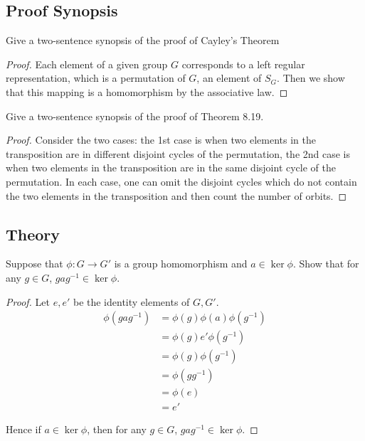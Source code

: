 \subsection*{Proof Synopsis}

\begin{exercise}
    Give a two-sentence synopsis of the proof of Cayley's Theorem
\end{exercise}

\begin{proof}
    Each element of a given group $G$ corresponds to a left regular representation, which is a permutation of $G$, an element of $S_{G}$. Then we show that this mapping is a homomorphism by the associative law.
\end{proof}

\begin{exercise}
    Give a two-sentence synopsis of the proof of Theorem 8.19.
\end{exercise}

\begin{proof}
    Consider the two cases: the 1st case is when two elements in the transposition are in different disjoint cycles of the permutation, the 2nd case is when two elements in the transposition are in the same disjoint cycle of the permutation. In each case, one can omit the disjoint cycles which do not contain the two elements in the transposition and then count the number of orbits.
\end{proof}

\subsection*{Theory}

\begin{exercise}
    Suppose that $\phi: G\to G'$ is a group homomorphism and $a\in \ker\phi$. Show that for any $g\in G$, $gag^{-1}\in \ker\phi$.
\end{exercise}

\begin{proof}
    Let $e, e'$ be the identity elements of $G, G'$.
    \begin{align*}
        \phi(gag^{-1}) & = \phi(g)\phi(a)\phi(g^{-1}) \\
                       & = \phi(g)e'\phi(g^{-1})      \\
                       & = \phi(g)\phi(g^{-1})        \\
                       & = \phi(gg^{-1})              \\
                       & = \phi(e)                    \\
                       & = e'
    \end{align*}

    Hence if $a\in\ker\phi$, then for any $g\in G$, $gag^{-1}\in\ker\phi$.
\end{proof}

